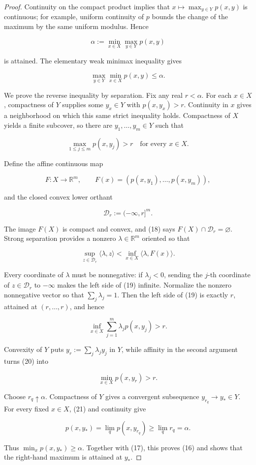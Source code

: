 \begin{proof}
Continuity on the compact product implies that
\(x\mapsto\max_{y\in Y}p(x,y)\) is continuous; for example, uniform
continuity of \(p\) bounds the change of the maximum by the same uniform
modulus. Hence

\[
\alpha:=\min_{x\in X}\max_{y\in Y}p(x,y)
\]

is attained. The elementary weak minimax inequality gives

\[
\max_{y\in Y}\min_{x\in X}p(x,y)\le\alpha.
\tag{17}
\]

We prove the reverse inequality by separation. Fix any real \(r<\alpha\).
For each \(x\in X\), compactness of \(Y\) supplies some \(y_x\in Y\) with
\(p(x,y_x)>r\). Continuity in \(x\) gives a neighborhood on which this same
strict inequality holds. Compactness of \(X\) yields a finite subcover, so
there are \(y_1,\ldots,y_m\in Y\) such that

\[
\max_{1\le j\le m}p(x,y_j)>r
\quad\text{for every }x\in X.
\tag{18}
\]

Define the affine continuous map

\[
F:X\to\mathbb R^m,
\qquad
F(x)=(p(x,y_1),\ldots,p(x,y_m)),
\]

and the closed convex lower orthant

\[
\mathcal D_r:=(-\infty,r]^m.
\]

The image \(F(X)\) is compact and convex, and (18) says
\(F(X)\cap\mathcal D_r=\varnothing\). Strong separation provides a nonzero
\(\lambda\in\mathbb R^m\) oriented so that

\[
\sup_{z\in\mathcal D_r}\langle\lambda,z\rangle
<
\inf_{x\in X}\langle\lambda,F(x)\rangle.
\tag{19}
\]

Every coordinate of \(\lambda\) must be nonnegative: if
\(\lambda_j<0\), sending the \(j\)-th coordinate of \(z\in\mathcal D_r\)
to \(-\infty\) makes the left side of (19) infinite. Normalize the nonzero
nonnegative vector so that \(\sum_j\lambda_j=1\). Then the left side of
(19) is exactly \(r\), attained at \((r,\ldots,r)\), and hence

\[
\inf_{x\in X}\sum_{j=1}^m\lambda_jp(x,y_j)>r.
\tag{20}
\]

Convexity of \(Y\) puts \(y_r:=\sum_j\lambda_jy_j\) in \(Y\), while
affinity in the second argument turns (20) into

\[
\min_{x\in X}p(x,y_r)>r.
\tag{21}
\]

Choose \(r_q\uparrow\alpha\). Compactness of \(Y\) gives a convergent
subsequence \(y_{r_q}\to y_*\in Y\). For every fixed \(x\in X\), (21) and
continuity give

\[
p(x,y_*)=\lim_q p(x,y_{r_q})\ge\lim_q r_q=\alpha.
\]

Thus \(\min_xp(x,y_*)\ge\alpha\). Together with (17), this proves (16) and
shows that the right-hand maximum is attained at \(y_*\). \end{proof}

